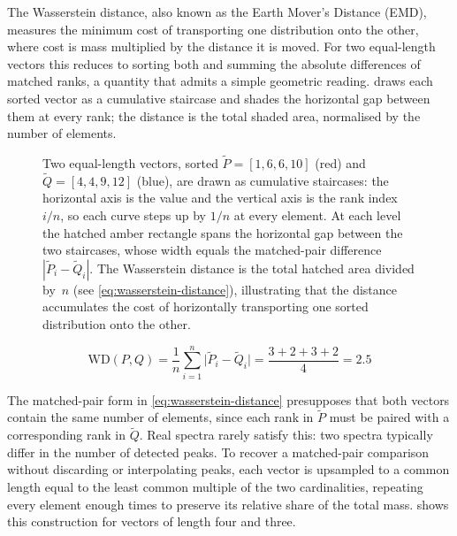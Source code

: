 The Wasserstein distance, also known as the Earth Mover's Distance (EMD), measures the minimum cost of transporting one distribution onto the other, where cost is mass multiplied by the distance it is moved. \cite[pp.~1--8]{Ciach2020} \cite{Memoli2011}
For two equal-length vectors this reduces to sorting both and summing the absolute differences of matched ranks, a quantity that admits a simple geometric reading.
 draws each sorted vector as a cumulative staircase and shades the horizontal gap between them at every rank; the distance is the total shaded area, normalised by the number of elements.

\begin{figure}[H]
    \centering
    \resizebox{\textwidth}{!}{
        
    }
    \caption[Wasserstein distance illustration]{
        Two equal-length vectors, sorted $\tilde P = [1,6,6,10]$ (red) and $\tilde Q = [4,4,9,12]$ (blue), are drawn as cumulative staircases:
        the horizontal axis is the value and the vertical axis is the rank index $i/n$, so each curve steps up by $1/n$ at every element.
        At each level the hatched amber rectangle spans the horizontal gap between the two staircases, whose width equals the matched-pair difference $|\tilde P_i - \tilde Q_i|$.
        The Wasserstein distance is the total hatched area divided by~$n$ (see \cref{eq:wasserstein-distance}),
        illustrating that the distance accumulates the cost of horizontally transporting one sorted distribution onto the other.
    }
    \label{fig:wasserstein-distance-illustration}
\end{figure}

\begin{equation}
    \label{eq:wasserstein-distance}
    \mathrm{WD}(P,Q)=\dfrac{1}{n}\sum_{i=1}^{n}\bigl|\tilde P_i-\tilde Q_i\bigr| =\dfrac{3+2+3+2}{4}=2.5
\end{equation}

The matched-pair form in \cref{eq:wasserstein-distance} presupposes that both vectors contain the same number of elements, since each rank in $\tilde P$ must be paired with a corresponding rank in $\tilde Q$.
Real spectra rarely satisfy this: two spectra typically differ in the number of detected peaks.
To recover a matched-pair comparison without discarding or interpolating peaks, each vector is upsampled to a common length equal to the least common multiple of the two cardinalities, repeating every element enough times to preserve its relative share of the total mass.
 shows this construction for vectors of length four and three.

